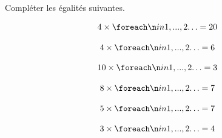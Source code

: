 \documentclass[a4paper]{book}
\begin{document}
\bigskip


\setcounter{exo}{1}

    \begin{exercice}
        Compléter les égalités suivantes.

        \begin{minipage}{0.3\linewidth}
            \[4\times \points[2] = 20\]

            \[4\times \points[2] = 6\]
        \end{minipage}
        \hfill\vline\hfill
        \begin{minipage}{0.3\linewidth}
            \[10\times \points[2] = 3\]

            \[8\times \points[2] = 7\]
        \end{minipage}
        \hfill\vline\hfill
        \begin{minipage}{0.3\linewidth}
            \[5\times \points[2] = 7\]

            \[3\times \points[2] = 4\]
        \end{minipage}
    \end{exercice}
\end{document}
